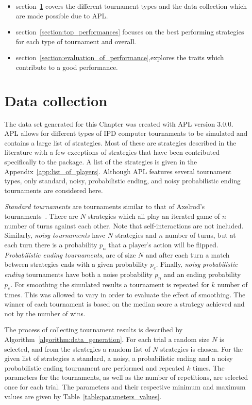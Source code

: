 \begin{itemize}
    \item section~\ref{section:data_collection} covers the different tournament
    types and the data collection which are made possible due to APL.
    \item section~\ref{section:top_performances} focuses on the best performing
    strategies for each type of tournament and overall.
    \item section~\ref{section:evaluation_of_performance},explores the traits
    which contribute to a good performance.
\end{itemize}

\section{Data collection}\label{section:data_collection}

The data set generated for this Chapter was created with APL version 3.0.0.
APL allows for different types of IPD computer
tournaments to be simulated and contains a large list of strategies.
Most of these are strategies described in the literature with a few exceptions
of strategies that have been contributed specifically to the package. A
list of the strategies is given in the Appendix~\ref{app:list_of_players}.
Although APL features several tournament types, only
standard, noisy, probabilistic ending, and noisy probabilistic ending
tournaments are considered here.

\textit{Standard tournaments} are tournaments similar to that of Axelrod's
tournaments~\cite{Axelrod1980a}. There are \(N\) strategies which all play an iterated
game of \(n\) number of turns against each other. Note that self-interactions
are not included. Similarly, \textit{noisy
tournaments} have \(N\) strategies and \(n\) number of turns, but at each turn
there is a probability \(p_n\) that a player's action will be flipped.
\textit{Probabilistic ending tournaments}, are of size \(N\) and after each turn
a match between strategies ends with a given probability \(p_e\). Finally,
\textit{noisy probabilistic ending} tournaments have both a noise probability
\(p_n\) and an ending probability \(p_e\). For smoothing the simulated results a
tournament is repeated for \(k\) number of times. This was allowed to vary
in order to evaluate the effect of smoothing. The winner of each tournament
is based on the median score a strategy achieved and not by the number of wins.

The process of collecting tournament results is described by
Algorithm~\ref{algorithm:data_generation}. For each trial a random size \(N\) is
selected, and from the \numberofstrategies strategies a random list of \(N\) strategies is
chosen. For the given list of strategies a standard, a noisy, a probabilistic
ending and a noisy probabilistic ending tournament are performed and repeated
\(k\) times. The parameters for the tournaments, as well as the number of
repetitions, are selected once for each trial. The parameters and their
respective minimum and maximum values are given by
Table~\ref{table:parameters_values}.

